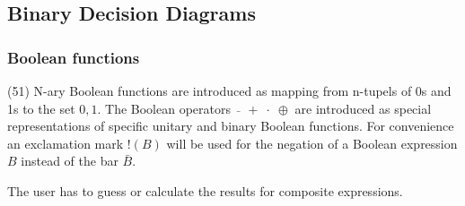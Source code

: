 %
%
%
%
%

\subsection{Binary Decision Diagrams}

\subsubsection{Boolean functions}
\label{tut:51}

(51) N-ary Boolean functions are introduced as mapping from n-tupels of 0s and 1s to the set ${0,1}$.
The Boolean operators $\bar{ \;\;}\;+\;\cdot\;\oplus$ are introduced as special representations of
specific unitary and binary Boolean functions. For convenience an exclamation mark $!(B)$ 
will be used for the negation of a Boolean expression $B$ instead of the bar $\bar{B}$. 

The user has to guess or calculate the results for composite expressions.
